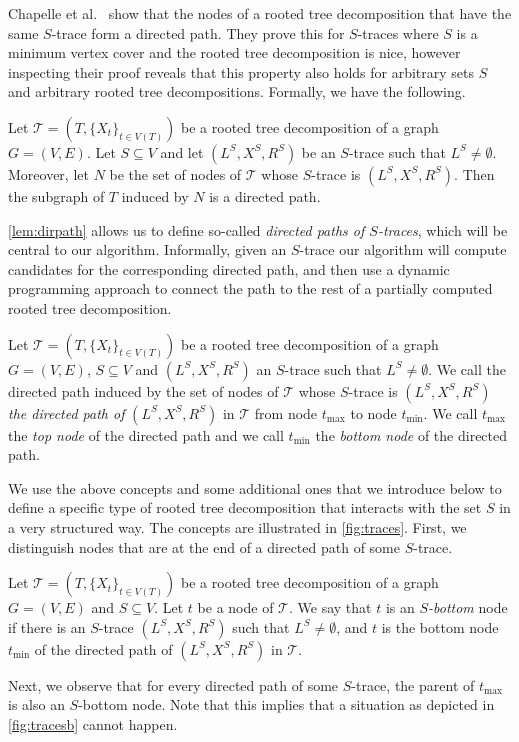 \documentclass[a4paper,UKenglish,cleveref, autoref, thm-restate, numberwithinsect]{lipics-v2021}
\newcounter{algorithm}
\begin{document}
Chapelle et al.~\cite{chapelle2017treewidth} show that the nodes of a rooted tree decomposition that have the same $S$-trace form a directed path. They prove this for $S$-traces where $S$ is a minimum vertex cover and the rooted tree decomposition is nice, however inspecting their proof reveals that this property also holds for arbitrary sets $S$ and arbitrary rooted tree decompositions. Formally, we have the following.

\begin{lemma}\label{lem:dirpath}
    Let $\mathcal{T}=(T,\{X_t\}_{t\in V(T)})$ be a rooted tree decomposition of a graph $G=(V,E)$. Let $S\subseteq V$ and let $(L^S, X^S, R^S)$ be an $S$-trace such that $L^S\ne \emptyset$. Moreover, let $N$ be the set of nodes of $\mathcal{T}$ whose $S$-trace is $(L^S, X^S, R^S)$. Then the subgraph of $T$ induced by $N$ is a directed path.
\end{lemma}
\cref{lem:dirpath} allows us to define so-called \emph{directed paths of $S$-traces}, which will be central to our algorithm. Informally, given an $S$-trace our algorithm will compute candidates for the corresponding directed path, and then use a dynamic programming approach to connect the path to the rest of a partially computed rooted tree decomposition.

\begin{definition}\label{def:path_of_a_trace}
    Let $\mathcal{T}=(T,\{X_t\}_{t\in V(T)})$ be a rooted tree decomposition of a graph $G=(V,E)$, $S\subseteq V$ and $(L^S, X^S, R^S)$ an $S$-trace such that $L^S\ne \emptyset$. We call the directed path induced by the set of nodes of $\mathcal{T}$ whose $S$-trace is $(L^S, X^S, R^S)$ \emph{the directed path of} $(L^S, X^S, R^S)$ in $\mathcal{T}$ from node $t_{\max}$ to node $t_{\min}$. We call $t_{\max}$ the \emph{top node} of the directed path and we call $t_{\min}$ the \emph{bottom node} of the directed path.
\end{definition}

We use the above concepts and some additional ones that we introduce below to define a specific type of rooted tree decomposition that interacts with the set $S$ in a very structured way. The concepts are illustrated in \cref{fig:traces}. First, we distinguish nodes that are at the end of a directed path of some $S$-trace.

\begin{definition}\label{def:bottom_node}
    Let $\mathcal{T}=(T,\{X_t\}_{t\in V(T)})$ be a rooted tree decomposition of a graph $G=(V,E)$ and $S\subseteq V$. Let $t$ be a node of $\mathcal{T}$.  We say that $t$ is an \emph{$S$-bottom} node if there is an $S$-trace $(L^S, X^S, R^S)$ such that $L^S\ne \emptyset$, and $t$ is the bottom node $t_{\min}$ of the directed path of $(L^S, X^S, R^S)$ in $\mathcal{T}$. 
\end{definition}
Next, we observe that for every directed path of some $S$-trace, the parent of $t_{\max}$ is also an $S$-bottom node. Note that this implies that a situation as depicted in \cref{fig:tracesb} cannot happen.
\end{document}
